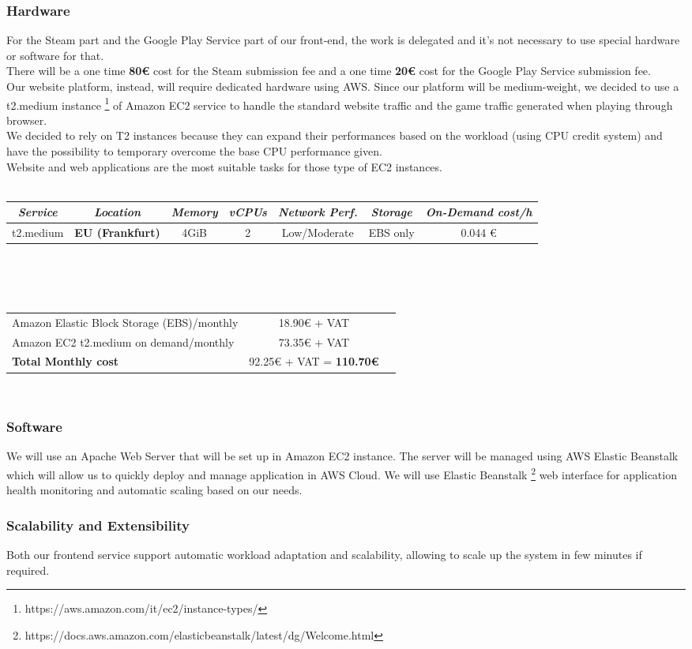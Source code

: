 \subsubsection{Hardware}
For the Steam part and the Google Play Service part of our front-end, the work is delegated and it's not necessary to use special hardware or software for that.\\
There will be a one time \textbf{80€} cost for the Steam submission fee and a one time \textbf{20€} cost for the Google Play Service submission fee.\\
Our website platform, instead, will require dedicated hardware using AWS. Since our platform will be medium-weight, we decided to use a t2.medium instance \footnote{https://aws.amazon.com/it/ec2/instance-types/} of Amazon EC2 service to handle the standard website traffic and the game traffic generated when playing through browser.\\
We decided to rely on T2 instances because they can expand their performances based on the workload (using CPU credit system) and have the possibility to temporary overcome the base CPU performance given.\\
Website and web applications are the most suitable tasks for those type of EC2 instances.\\
\\
\begin{tabular}{|c|c|c|c|c|c|c|}
\hline
\textit{Service} & \textit{Location} & \textit{Memory} & \textit{vCPUs} & \textit{Network Perf.} & \textit{Storage} & \textit{On-Demand cost/h}\\
\hline
t2.medium &	\textbf{EU (Frankfurt)} & 4GiB &	2 &	Low/Moderate & EBS only & 0.044 €\\
\hline
\end{tabular}
\\\\\\
\begin{tabular}{lcr}
Amazon Elastic Block Storage (EBS)/monthly  & 18.90€ + VAT \\
Amazon EC2 t2.medium on demand/monthly & 73.35€ + VAT \\
\hline
\textbf{Total Monthly cost} & 92.25€ + VAT = \textbf{110.70€}
\end{tabular}
\\
\subsubsection{Software}
We will use an Apache Web Server that will be set up in Amazon EC2 instance. The server will be managed using AWS Elastic Beanstalk which will allow us to quickly deploy and manage application in AWS Cloud. We will use Elastic Beanstalk \footnote{https://docs.aws.amazon.com/elasticbeanstalk/latest/dg/Welcome.html} web interface for application health monitoring and automatic scaling based on our needs.

\subsubsection{Scalability and Extensibility}
Both our frontend service support automatic workload adaptation and scalability, allowing to scale up the system in few minutes if required. \\